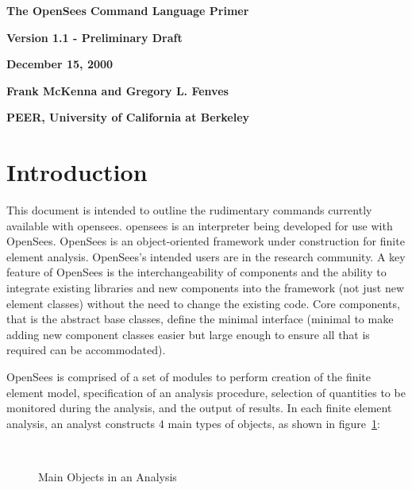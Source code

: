 \documentclass[12pt]{article}
\begin{document}


\begin{center}
{\bf \Large The OpenSees Command Language Primer} 

{\bf Version 1.1 - Preliminary Draft} 

{\bf  December 15, 2000} 

{\bf  Frank McKenna and Gregory L. Fenves} 

{\bf  PEER, University of California at Berkeley}
\end{center}

\vspace{.2in}
\section{Introduction}
This document is intended to outline the rudimentary commands
currently available with opensees. opensees is an interpreter being developed for
use with OpenSees. OpenSees is an object-oriented framework under construction for
finite element analysis. OpenSees's intended users are in the research
community. A key feature of OpenSees is the interchangeability of components
and the ability to integrate existing libraries and new components
into the framework (not just new element classes) without the need to
change the existing code. Core components, that is the abstract base
classes, define the minimal interface (minimal to make adding new
component classes easier but large enough to ensure all that is
required can be accommodated). 

OpenSees is comprised of a set of modules to perform creation of the finite 
element model, specification of an analysis procedure, selection
of quantities to be monitored during the analysis, and the output of
results. In each finite element analysis, an analyst constructs 4 main
types of objects, as shown in figure~\ref{main}:


\begin{figure}[htpb]
\begin{center}
\leavevmode
\hbox{%
}
\end{center}
\caption{Main Objects in an Analysis}
\label{main}
\end{figure}
\end{document}
